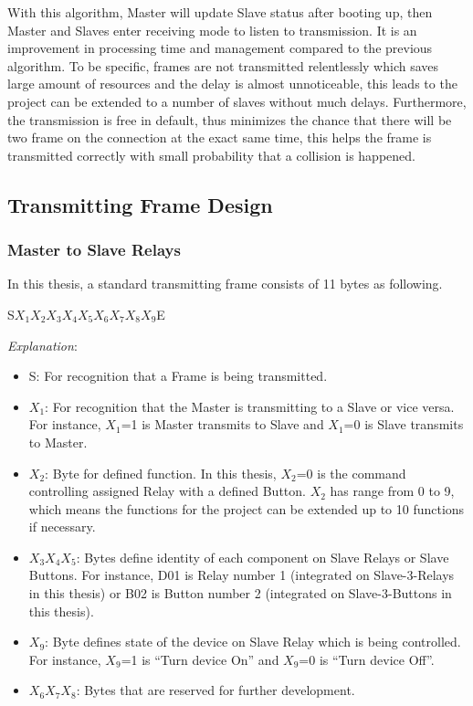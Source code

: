 With this algorithm, Master will update Slave status after booting up, then Master and Slaves enter receiving mode to listen to transmission. It is an improvement in processing time and management compared to the previous algorithm. To be specific, frames are not transmitted relentlessly which saves large amount of resources and the delay is almost unnoticeable, this leads to the project can be extended to a number of slaves without much delays. Furthermore, the transmission is free in default, thus minimizes the chance that there will be two frame on the connection at the exact same time, this helps the frame is transmitted correctly with small probability that a collision is happened.

\subsection{Transmitting Frame Design}
    \subsubsection{Master to Slave Relays}
    In this thesis, a standard transmitting frame consists of 11 bytes as following.

    \begin{center}
    S$X_1$$X_2$$X_3$$X_4$$X_5$$X_6$$X_7$$X_8$$X_9$E
    \end{center}

    \textit{Explanation}:
    \begin{itemize}
        \item S: For recognition that a Frame is being transmitted.
        \item $X_1$: For recognition that the Master is transmitting to a Slave or vice versa. For instance, $X_1$=1 is Master transmits to Slave and $X_1$=0 is Slave transmits to Master.
        \item $X_2$: Byte for defined function. In this thesis, $X_2$=0 is the command controlling assigned Relay with a defined Button. $X_2$ has range from 0 to 9, which means the functions for the project can be extended up to 10 functions if necessary. 
        \item $X_3$$X_4$$X_5$: Bytes define identity of each component on Slave Relays or Slave Buttons. For instance, D01 is Relay number 1 (integrated on Slave-3-Relays in this thesis) or B02 is Button number 2 (integrated on Slave-3-Buttons in this thesis).
        \item $X_9$: Byte defines state of the device on Slave Relay which is being controlled. For instance, $X_9$=1 is “Turn device On” and $X_9$=0 is “Turn device Off”.
        \item $X_6$$X_7$$X_8$: Bytes that are reserved for further development.
        \end{itemize}

